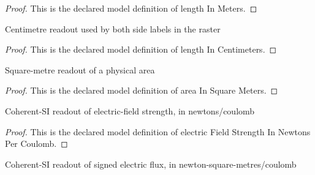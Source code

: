 \begin{proof}
  This is the declared model definition of length In Meters.
\end{proof}
\begin{definition}
  \label{def:physics:phyx-mini-0844:phyxminiproblems-problemphyxmini0844-lengthincentimeters}
  Centimetre readout used by both side labels in the raster
\end{definition}
\begin{proof}
  This is the declared model definition of length In Centimeters.
\end{proof}
\begin{definition}
  \label{def:physics:phyx-mini-0844:phyxminiproblems-problemphyxmini0844-areainsquaremeters}
  Square-metre readout of a physical area
\end{definition}
\begin{proof}
  This is the declared model definition of area In Square Meters.
\end{proof}
\begin{definition}
  \label{def:physics:phyx-mini-0844:phyxminiproblems-problemphyxmini0844-electricfieldstrengthinnewtonspercoulomb}
  Coherent-SI readout of electric-field strength, in newtons/coulomb
\end{definition}
\begin{proof}
  This is the declared model definition of electric Field Strength In Newtons Per Coulomb.
\end{proof}
\begin{definition}
  \label{def:physics:phyx-mini-0844:phyxminiproblems-problemphyxmini0844-electricfluxinnewtonsquaremeterspercoulomb}
  Coherent-SI readout of signed electric flux, in newton-square-metres/coulomb
\end{definition}
